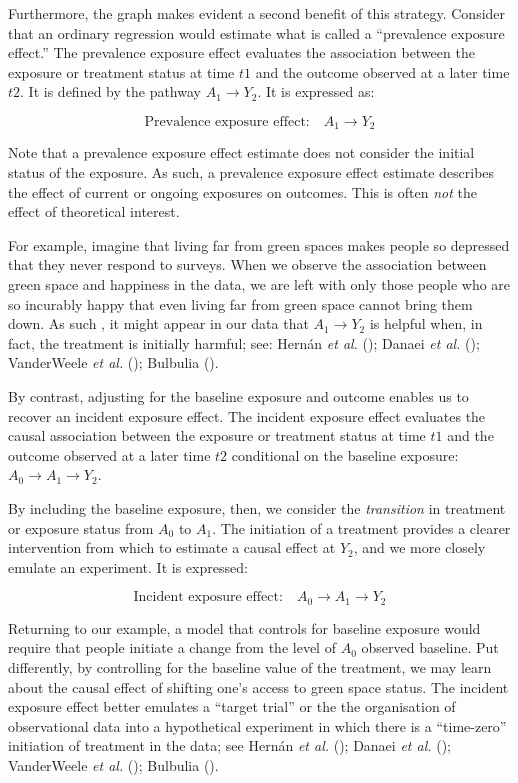 \documentclass[
  singlecolumn]{article}
\begin{document}
Furthermore, the graph makes evident a second benefit of this strategy.
Consider that an ordinary regression would estimate what is called a
``prevalence exposure effect.'' The prevalence exposure effect evaluates
the association between the exposure or treatment status at time \(t1\)
and the outcome observed at a later time \(t2\). It is defined by the
pathway \(A_{1} \to Y_{2}\). It is expressed as:

\[
\text{Prevalence exposure effect:} \quad A_{1} \to Y_{2}
\]

Note that a prevalence exposure effect estimate does not consider the
initial status of the exposure. As such, a prevalence exposure effect
estimate describes the effect of current or ongoing exposures on
outcomes. This is often \emph{not} the effect of theoretical interest.

For example, imagine that living far from green spaces makes people so
depressed that they never respond to surveys. When we observe the
association between green space and happiness in the data, we are left
with only those people who are so incurably happy that even living far
from green space cannot bring them down. As such , it might appear in
our data that \(A_{1} \to Y_{2}\) is helpful when, in fact, the
treatment is initially harmful; see: Hernán \emph{et al.}
(); Danaei \emph{et al.}
(); VanderWeele \emph{et al.}
(); Bulbulia
().

By contrast, adjusting for the baseline exposure and outcome enables us
to recover an incident exposure effect. The incident exposure effect
evaluates the causal association between the exposure or treatment
status at time \(t1\) and the outcome observed at a later time \(t2\)
conditional on the baseline exposure: \(A_{0} \to A_{1} \to Y_{2}\).

By including the baseline exposure, then, we consider the
\emph{transition} in treatment or exposure status from \(A_0\) to
\(A_1\). The initiation of a treatment provides a clearer intervention
from which to estimate a causal effect at \(Y_2\), and we more closely
emulate an experiment. It is expressed:

\[
\text{Incident exposure effect:} \quad \boxed{A_{0}} \to A_{1} \to Y_{2}
\]

Returning to our example, a model that controls for baseline exposure
would require that people initiate a change from the level of \(A_0\)
observed baseline. Put differently, by controlling for the baseline
value of the treatment, we may learn about the causal effect of shifting
one's access to green space status. The incident exposure effect better
emulates a ``target trial'' or the the organisation of observational
data into a hypothetical experiment in which there is a ``time-zero''
initiation of treatment in the data; see Hernán \emph{et al.}
(); Danaei \emph{et al.}
(); VanderWeele \emph{et al.}
(); Bulbulia
().
\end{document}
